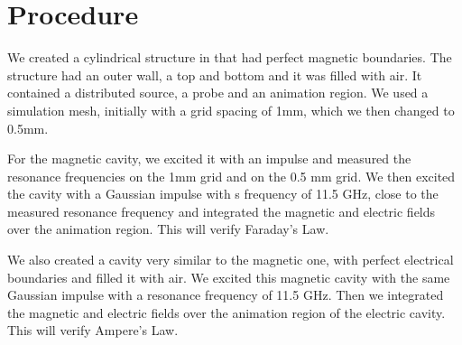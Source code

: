 \section{Procedure}\label{sec:procedure}
We created a cylindrical structure in \mefisto{} that had perfect magnetic boundaries. The structure had an outer wall, a top and bottom and it was filled with air. It contained a distributed source, a probe and an animation region. We used a simulation mesh, initially with a grid spacing of 1mm, which we then changed to 0.5mm. 


For the magnetic cavity, we excited it with an impulse and measured the resonance frequencies on the 1mm grid and on the 0.5 mm grid. We then excited the cavity with a Gaussian impulse with s frequency of 11.5 GHz, close to the measured resonance frequency and integrated the magnetic and electric fields over the animation region.  This will verify Faraday's Law.


We also created a cavity very similar to the magnetic one, with perfect electrical boundaries and filled it with air.  We excited this magnetic cavity with the same Gaussian impulse with a resonance frequency of 11.5 GHz. Then we integrated the magnetic and electric fields over the animation region of the electric cavity. This will verify Ampere's Law.


